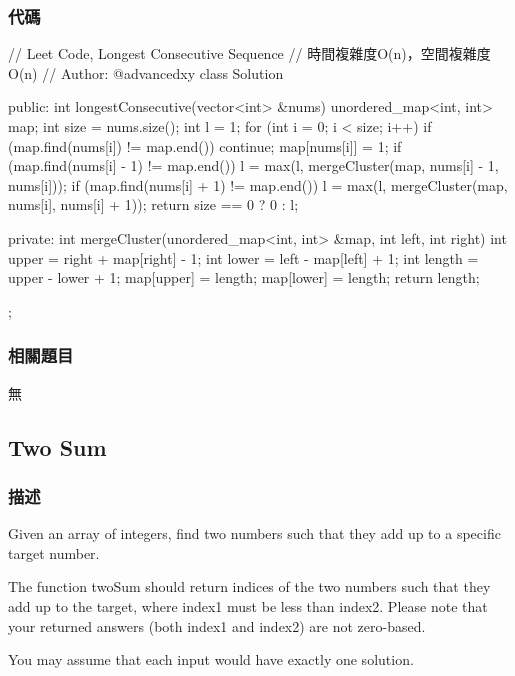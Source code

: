 \subsubsection{代碼}

\begin{Code}
// Leet Code, Longest Consecutive Sequence
// 時間複雜度O(n)，空間複雜度O(n)
// Author: @advancedxy
class Solution {
public:
    int longestConsecutive(vector<int> &nums) {
        unordered_map<int, int> map;
        int size = nums.size();
        int l = 1;
        for (int i = 0; i < size; i++) {
            if (map.find(nums[i]) != map.end()) continue;
            map[nums[i]] = 1;
            if (map.find(nums[i] - 1) != map.end()) {
                l = max(l, mergeCluster(map, nums[i] - 1, nums[i]));
            }
            if (map.find(nums[i] + 1) != map.end()) {
                l = max(l, mergeCluster(map, nums[i], nums[i] + 1));
            }
        }
        return size == 0 ? 0 : l;
    }

private:
    int mergeCluster(unordered_map<int, int> &map, int left, int right) {
        int upper = right + map[right] - 1;
        int lower = left - map[left] + 1;
        int length = upper - lower + 1;
        map[upper] = length;
        map[lower] = length;
        return length;
    }
};
\end{Code}

\subsubsection{相關題目}
\begindot
\item 無
\myenddot


\subsection{Two Sum} %
\label{sec:Two-sum}


\subsubsection{描述}
Given an array of integers, find two numbers such that they add up to a specific target number.

The function twoSum should return indices of the two numbers such that they add up to the target, where index1 must be less than index2. Please note that your returned answers (both index1 and index2) are not zero-based.

You may assume that each input would have exactly one solution.

